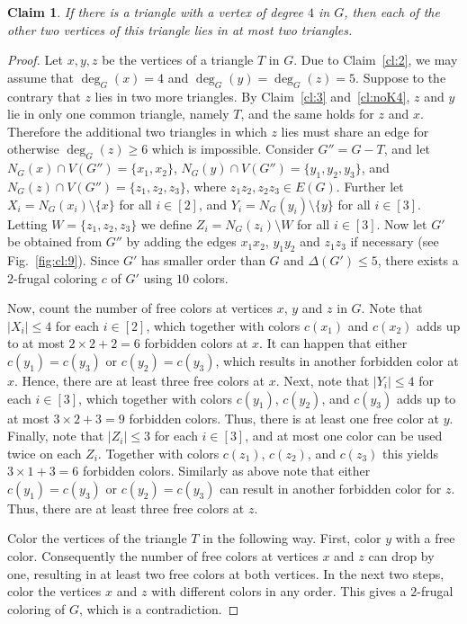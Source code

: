 \documentclass[10pt,a4paper]{article}
\newtheorem{claim}{Claim}
\begin{document}
\begin{claim} If there is a triangle with a vertex of degree $4$ in $G$, then each of the other two vertices of this triangle lies in at most two triangles.
\label{cl:9}
\end{claim} 
\begin{proof}
Let $x,y,z$ be the vertices of a triangle $T$ in $G$. Due to Claim~\ref{cl:2}, we may assume that $\deg_G(x)=4$ and $\deg_G(y)=\deg_G(z)=5$. Suppose to the contrary that $z$ lies in two more triangles. By Claim~\ref{cl:3} and~\ref{cl:noK4}, $z$ and $y$ lie in only one common triangle, namely $T$, and the same holds for $z$ and $x$. Therefore the additional two triangles in which $z$ lies must share an edge for otherwise $\deg_G(z)\ge 6$ which is impossible. Consider $G''=G-T$, and let $N_G(x) \cap V(G'')=\{x_1,x_2\}$, $N_G(y) \cap V(G'')=\{y_1,y_2,y_3\}$, and $N_G(z) \cap V(G'')=\{z_1,z_2,z_3\}$, where $z_1z_2, z_2z_3 \in E(G)$. Further let $X_i=N_G(x_i)\setminus\{x\}$ for all $i\in[2]$, and $Y_i=N_G(y_i)\setminus\{y\}$ for all $i\in [3]$. Letting $W=\{z_1,z_2,z_3\}$ we define $Z_i=N_G(z_i)\setminus W$ for all $i \in [3]$. Now let $G'$ be obtained from $G''$ by adding the edges $x_1x_2$, $y_1y_2$ and $z_1z_3$ if necessary (see Fig.~\ref{fig:cl:9}). Since $G'$ has smaller order than $G$ and $\Delta(G') \le 5$, there exists a $2$-frugal coloring $c$ of $G'$ using $10$ colors.

Now, count the number of free colors at vertices $x$, $y$ and $z$ in $G$. Note that $|X_i| \le 4$ for each $i\in [2]$, which together with colors $c(x_1)$ and $c(x_2)$ adds up to at most $2 \times 2 + 2=6$ forbidden colors at $x$. It can happen that either $c(y_1)=c(y_3)$ or $c(y_2)=c(y_3)$, which results in another forbidden color at $x$. Hence, there are at least three free colors at $x$. Next, note that $|Y_i| \le 4$ for each $i\in [3]$, which together with colors $c(y_1)$, $c(y_2)$, and $c(y_3)$ adds up to at most $3 \times 2 +3=9$ forbidden colors. Thus, there is at least one free color at $y$. Finally, note that $|Z_i| \le 3$ for each $i\in [3]$, and at most one color can be used twice on each $Z_i$. Together with colors $c(z_1)$, $c(z_2)$, and $c(z_3)$ this yields $3 \times 1 +3=6$ forbidden colors. Similarly as above note that either $c(y_1)=c(y_3)$ or $c(y_2)=c(y_3)$ can result in another forbidden color for $z$. Thus, there are at least three free colors at $z$.

Color the vertices of the triangle $T$ in the following way. First, color $y$ with a free color. Consequently the number of free colors at vertices $x$ and $z$ can drop by one, resulting in at least two free colors at both vertices. In the next two steps, color the vertices $x$ and $z$ with different colors in any order. This gives a $2$-frugal coloring of $G$, which is a contradiction.
\end{proof}
\end{document}
